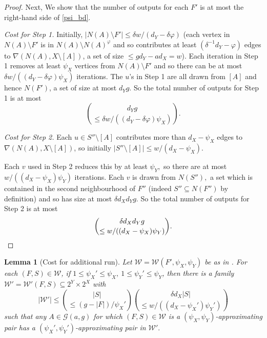 \documentclass[10pt,a4paper]{amsart}
\newtheorem{lem}[thm]{Lemma}
\theoremstyle{definition}
\newcommand{\cG}{\mathcal{G} }
\newcommand{\cW}{\mathcal{W} }
\newcommand{\beq}[1]{\begin{equation}\label{#1}}
\newcommand{\enq}[0]{\end{equation}}
\newcommand{\nin}[0]{\noindent}
\newcommand{\sub}[0]{\subseteq}
\newcommand{\0}[0]{\emptyset}
\begin{document}
\begin{proof}
    Next, We show that the number of outputs for each $F'$ is at most the right-hand side of \eqref{psi_bd}. 

    \nin \textit{Cost for Step 1.} Initially, $|N(A) \setminus F'| \le \delta w/(d_Y-\delta\varphi)$ (each vertex in $N(A) \setminus F'$ is in $N(A) \setminus N(A)^\varphi$ and so contributes at least $(\delta^{-1}d_Y-\varphi)$ edges to $\nabla(N(A), X \setminus [A])$, a set of size $\leq gd_Y-ad_X=w$). Each iteration in Step 1 removes at least $\psi_X$ vertices from $N(A) \setminus F'$ and so there can be at most $\delta w/((d_Y-\delta\varphi)\psi_X)$ iterations. The $u$'s in Step 1 are all drawn from $[A]$ and hence $N(F')$, a set of size at most $d_Yg$. So the total number of outputs for Step 1 is at most \[{d_Yg \choose \le \delta w/((d_Y-\delta\varphi)\psi_X)}.\]

    \nin \textit{Cost for Step 2.} Each $u \in S'' \setminus [A]$ contributes more than $d_X-\psi_X$ edges to $\nabla(N(A), X \setminus [A])$, so initially $|S'' \setminus [A]| \le w/(d_X-\psi_X).$
    
    Each $v$ used in Step 2 reduces this by at least $\psi_Y,$ so there are at most $w/((d_X-\psi_X)\psi_Y)$ iterations. Each $v$ is drawn from $N(S''),$ a set which is contained in the second neighbourhood of $F''$ (indeed $S''\subseteq N(F'')$ by definition) and so has size at most $\delta d_Xd_Y g.$ So the total number of outputs for Step 2 is at most
    \[{\delta d_X d_Y g \choose \le w/((d_X-\psi_X)\psi_Y)}. \qedhere \]
\end{proof}

\begin{lem}[Cost for additional run]\label{lem.heart} Let $\cW=\cW(F', \psi_X, \psi_Y)$ be as in .
    For each $(F,S) \in \cW$, if $1 \le \psi_X'\leq \psi_X, \ 1\leq \psi_Y' \le \psi_Y$, then there is a family $\cW'=\cW'(F,S) \sub 2^Y \times 2^X$ with
    \beq{psi'_bd}|\cW'|\le {|S| \choose \le (g-|F|)/\psi_X'}{\delta d_X|S| \choose \le w/((d_X-\psi_X')\psi_Y')}\enq
    such that any $A \in \cG(a,g)$ for which $(F,S)\in \cW$ is a $(\psi_X, \psi_Y)$-approximating pair has a $(\psi_X', \psi_Y')$-approximating pair in $\cW'.$
\end{lem}
\end{document}

